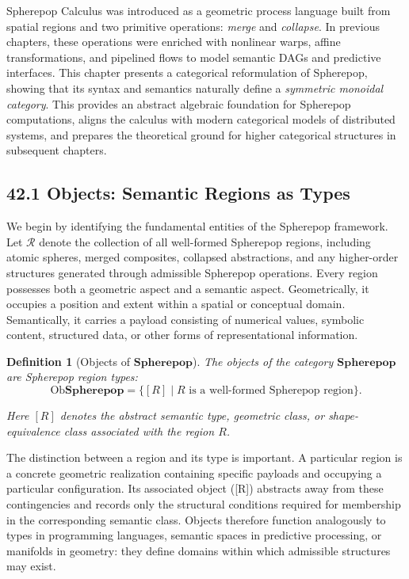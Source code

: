 \documentclass[12pt,letterpaper]{article}
\newtheorem{definition}[theorem]{Definition}
\theoremstyle{remark}
\begin{document}
Spherepop Calculus was introduced as a geometric process language built from spatial regions and two primitive operations: \emph{merge} and \emph{collapse}. In previous chapters, these operations were enriched with nonlinear warps, affine transformations, and pipelined flows to model semantic DAGs and predictive interfaces. This chapter presents a categorical reformulation of Spherepop, showing that its syntax and semantics naturally define a \emph{symmetric monoidal category}. This provides an abstract algebraic foundation for Spherepop computations, aligns the calculus with modern categorical models of distributed systems, and prepares the theoretical ground for higher categorical structures in subsequent chapters.

\subsection{42.1 Objects: Semantic Regions as Types}

We begin by identifying the fundamental entities of the Spherepop framework. Let $\mathcal{R}$ denote the collection of all well-formed Spherepop regions, including atomic spheres, merged composites, collapsed abstractions, and any higher-order structures generated through admissible Spherepop operations. Every region possesses both a geometric aspect and a semantic aspect. Geometrically, it occupies a position and extent within a spatial or conceptual domain. Semantically, it carries a payload consisting of numerical values, symbolic content, structured data, or other forms of representational information.

\begin{definition}[Objects of $\mathbf{Spherepop}$]
The objects of the category $\mathbf{Spherepop}$ are Spherepop region types:
\[
\mathrm{Ob}\mathbf{Spherepop} = \{ [R] \mid R \text{ is a well-formed Spherepop region} \}.
\]

Here $[R]$ denotes the abstract semantic type, geometric class, or shape-equivalence class associated with the region $R$.
\end{definition}

The distinction between a region and its type is important. A particular region is a concrete geometric realization containing specific payloads and occupying a particular configuration. Its associated object ([R]) abstracts away from these contingencies and records only the structural conditions required for membership in the corresponding semantic class. Objects therefore function analogously to types in programming languages, semantic spaces in predictive processing, or manifolds in geometry: they define domains within which admissible structures may exist.
\end{document}
